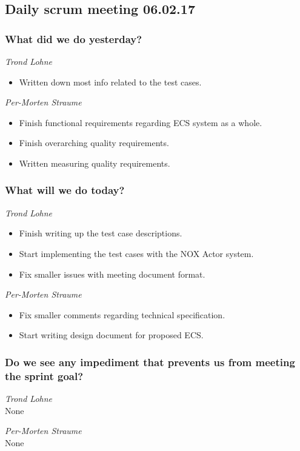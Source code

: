 \documentclass{article}
\begin{document}
\begin{center}
\subsection*{Daily scrum meeting 06.02.17}
\end{center}
\bigskip


\subsubsection*{What did we do yesterday?}

\noindent\textit{Trond Lohne}
\begin{itemize}
    \item
    Written down most info related to the test cases.
\end{itemize}

\medskip

\noindent\textit{Per-Morten Straume}
\begin{itemize}
    \item
    Finish functional requirements regarding ECS system as a whole.

    \item
    Finish overarching quality requirements.

    \item
    Written measuring quality requirements.
\end{itemize}

\subsubsection*{What will we do today?}

\noindent\textit{Trond Lohne}
\begin{itemize}
    \item
    Finish writing up the test case descriptions.

    \item
    Start implementing the test cases with the NOX Actor system.

    \item
    Fix smaller issues with meeting document format.
\end{itemize}


\medskip

\noindent\textit{Per-Morten Straume}
\begin{itemize}
    \item
    Fix smaller comments regarding technical specification.

    \item
    Start writing design document for proposed ECS.
\end{itemize}

\subsubsection*{Do we see any impediment that prevents us from meeting the sprint goal?}

\noindent\textit{Trond Lohne}\\
None

\medskip

\noindent\textit{Per-Morten Straume}\\
None
\end{document}
